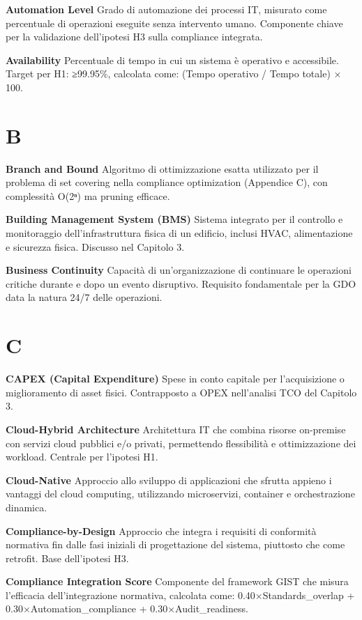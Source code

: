 \documentclass[12pt,a4paper,oneside]{book}
\numberwithin{figure}{chapter} %
\numberwithin{table}{chapter}  %
\begin{document}
\textbf{Automation Level} Grado di automazione dei processi IT, misurato
come percentuale di operazioni eseguite senza intervento umano.
Componente chiave per la validazione dell'ipotesi H3 sulla compliance
integrata.

\textbf{Availability} Percentuale di tempo in cui un sistema è operativo
e accessibile. Target per H1: ≥99.95\%, calcolata come: (Tempo operativo
/ Tempo totale) × 100.

\section{B}\label{b}

\textbf{Branch and Bound} Algoritmo di ottimizzazione esatta utilizzato
per il problema di set covering nella compliance optimization (Appendice
C), con complessità O(2ⁿ) ma pruning efficace.

\textbf{Building Management System (BMS)} Sistema integrato per il
controllo e monitoraggio dell'infrastruttura fisica di un edificio,
inclusi HVAC, alimentazione e sicurezza fisica. Discusso nel Capitolo 3.

\textbf{Business Continuity} Capacità di un'organizzazione di continuare
le operazioni critiche durante e dopo un evento disruptivo. Requisito
fondamentale per la GDO data la natura 24/7 delle operazioni.

\section{C}\label{c}

\textbf{CAPEX (Capital Expenditure)} Spese in conto capitale per
l'acquisizione o miglioramento di asset fisici. Contrapposto a OPEX
nell'analisi TCO del Capitolo 3.

\textbf{Cloud-Hybrid Architecture} Architettura IT che combina risorse
on-premise con servizi cloud pubblici e/o privati, permettendo
flessibilità e ottimizzazione dei workload. Centrale per l'ipotesi H1.

\textbf{Cloud-Native} Approccio allo sviluppo di applicazioni che
sfrutta appieno i vantaggi del cloud computing, utilizzando
microservizi, container e orchestrazione dinamica.

\textbf{Compliance-by-Design} Approccio che integra i requisiti di
conformità normativa fin dalle fasi iniziali di progettazione del
sistema, piuttosto che come retrofit. Base dell'ipotesi H3.

\textbf{Compliance Integration Score} Componente del framework GIST che
misura l'efficacia dell'integrazione normativa, calcolata come:
0.40×Standards\_overlap + 0.30×Automation\_compliance +
0.30×Audit\_readiness.
\end{document}

